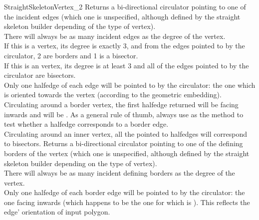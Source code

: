 \begin{ccRefConcept}{StraightSkeletonVertex_2}
\ccAccessFunctions
  \ccGlue
  \ccGlue
  \ccGlue
  \ccGlue
{Returns a bi-directional circulator pointing to one of the incident edges (which one is unspecified, although defined by the straight skeleton builder depending of the type of vertex).\\
There will always be as many incident edges as the degree of the vertex.\\
If this is a  vertex, its degree is exactly 3, and from the edges pointed to by the circulator, 2 are borders and 1 is a bisector.\\
If this is an  vertex, its degree is at least 3 and all of the edges pointed to by the circulator are bisectors.\\
Only one halfedge of each edge will be pointed to by the circulator: the one which is oriented towards the vertex (according to the geometric embedding).\\
Circulating around a border vertex, the first halfedge returned will be facing inwards and  will be . As a general rule of thumb, always use  as the method to test whether a halfedge corresponds to a border edge.\\
Circulating around an inner vertex, all the pointed to halfedges will correspond to bisectors.}
  \ccGlue
  \ccGlue
{Returns a bi-directional circulator pointing to one of the defining borders of the vertex (which one is unspecified, although defined by the straight skeleton builder depending on the type of vertex).\\
There will always be as many incident defining borders as the degree of the vertex.\\
Only one halfedge of each border edge will be pointed to by the circulator: the one facing inwards (which happens to be the one for which  is ). This reflects the edge' orientation of input polygon.}



\end{ccRefConcept}
